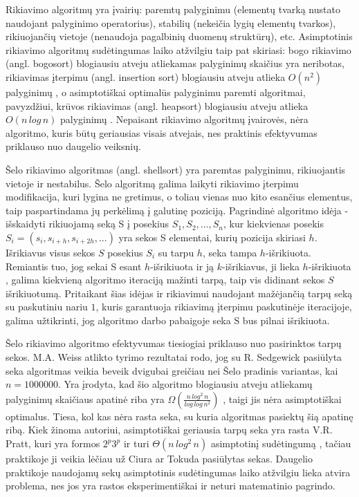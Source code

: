 \documentclass{VUMIFInfKursinis}
\begin{document}
Rikiavimo algoritmų yra įvairių:
paremtų palyginimu (elementų tvarką nustato naudojant palyginimo operatorius),
stabilių (nekeičia lygių elementų tvarkos),
rikiuojančių vietoje (nenaudoja pagalbinių duomenų struktūrų), etc.
Asimptotinis rikiavimo algoritmų sudėtingumas laiko atžvilgiu taip pat skiriasi:
bogo rikiavimo (angl. bogosort) \cite{10.1007/978-3-540-72914-3_17} blogiausiu atveju atliekamas palyginimų skaičius yra neribotas,
rikiavimas įterpimu (angl. insertion sort) blogiausiu atveju atlieka $O(n^2)$ palyginimų \cite{bender2006insertion},
o asimptotiškai optimalūs palyginimu paremti algoritmai, pavyzdžiui, krūvos rikiavimas (angl. heapsort) \cite{10.1145/512274.512284}
blogiausiu atveju atlieka $O(n\,log\,n)$ palyginimų \cite{SCHAFFER199376}.
Nepaisant rikiavimo algoritmų įvairovės, nėra algoritmo, kuris būtų geriausias visais atvejais,
nes praktinis efektyvumas priklauso nuo daugelio veiksnių.

Šelo rikiavimo algoritmas (angl. shellsort) \cite{10.1145/368370.368387} yra paremtas palyginimu, rikiuojantis vietoje ir nestabilus.
Šelo algoritmą galima laikyti rikiavimo įterpimu modifikacija,
kuri lygina ne gretimus, o toliau vienas nuo kito esančius elementus, taip paspartindama jų perkėlimą į galutinę poziciją.
Pagrindinė algoritmo idėja - išskaidyti rikiuojamą seką S į posekius $S_1, S_2, ..., S_n$,
kur kiekvienas posekis $S_i = (s_i, s_{i+h}, s_{i+2h}, ...)$ yra sekos S elementai, kurių pozicija skiriasi $h$.
Išrikiavus visus sekos $S$ posekius $S_i$ su tarpu $h$, seka tampa $h$-išrikiuota.
Remiantis tuo, jog sekai S esant $h$-išrikiuota ir ją $k$-išrikiavus, ji lieka $h$-išrikiuota \cite{GALE1972103},
galima kiekvieną algoritmo iteraciją mažinti tarpą, taip vis didinant sekos $S$ išrikiuotumą. %
Pritaikant šias idėjas ir rikiavimui naudojant mažėjančią tarpų seką su paskutiniu nariu $1$,
kuris garantuoja rikiavimą įterpimu paskutinėje iteracijoje,
galima užtikrinti, jog algoritmo darbo pabaigoje seka S bus pilnai išrikiuota.

Šelo rikiavimo algoritmo efektyvumas tiesiogiai priklauso nuo pasirinktos tarpų sekos.
M.A. Weiss atlikto tyrimo \cite{weiss1991short} rezultatai rodo, jog su R. Sedgewick pasiūlyta seka
algoritmas veikia beveik dvigubai greičiau nei Šelo pradinis variantas, kai $n = 1000000$.
Yra įrodyta, kad šio algoritmo blogiausiu atveju atliekamų palyginimų skaičiaus apatinė riba yra
$\Omega(\frac{n\,log^2\,n}{log\,log\,n^2})$ \cite{267769}, taigi jis nėra asimptotiškai optimalus.
Tiesa, kol kas nėra rasta seka, su kuria algoritmas pasiektų šią apatinę ribą.
Kiek žinoma autoriui, asimptotiškai geriausia tarpų seka yra rasta V.R. Pratt, kuri yra formos
$2^p3^p$ ir turi $\Theta(n\,log^2\,n)$ asimptotinį sudėtingumą \cite{pratt1972shellsort},
tačiau praktikoje ji veikia lėčiau už Ciura \cite{ciura2001best} ar Tokuda \cite{10.5555/645569.659879} pasiūlytas sekas.
Daugelio praktikoje naudojamų sekų asimptotinis sudėtingumas laiko atžvilgiu lieka atvira problema,
nes jos yra rastos eksperimentiškai ir neturi matematinio pagrindo.
\end{document}
